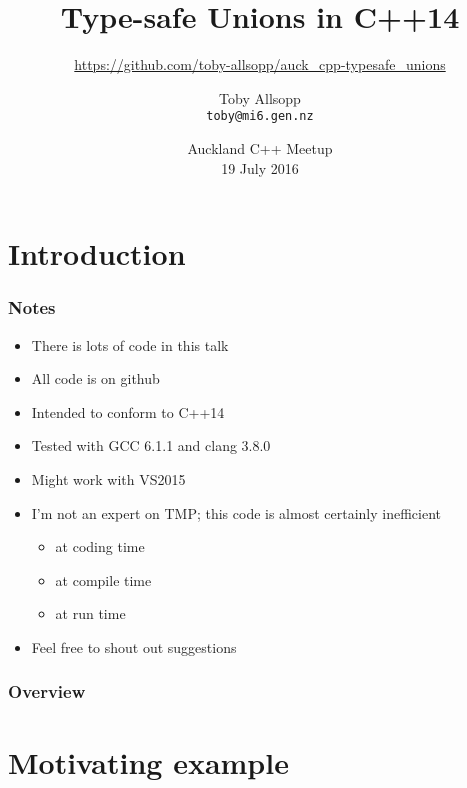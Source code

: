 \documentclass[aspectratio=169]{beamer}
\date{Auckland C++ Meetup\\19 July 2016}
\title{Type-safe Unions in C++14}
\subtitle{\small\url{https://github.com/toby-allsopp/auck_cpp-typesafe_unions}}
\author[Toby Allsopp]{Toby Allsopp\\\texttt{toby@mi6.gen.nz}}
\begin{document}

\frame{\titlepage}

\section{Introduction}

\begin{frame}
  \frametitle{Notes}
  \begin{itemize}
  \item There is lots of code in this talk
  \item All code is on github
  \item Intended to conform to C++14
  \item Tested with GCC 6.1.1 and clang 3.8.0
  \item Might work with VS2015
  \item I'm not an expert on TMP; this code is almost certainly inefficient
    \begin{itemize}
    \item at coding time
    \item at compile time
    \item at run time
    \end{itemize}
  \item Feel free to shout out suggestions
  \end{itemize}
\end{frame}

\begin{frame}
  \frametitle{Overview}
  \tableofcontents
\end{frame}


\section{Motivating example}
\end{document}
